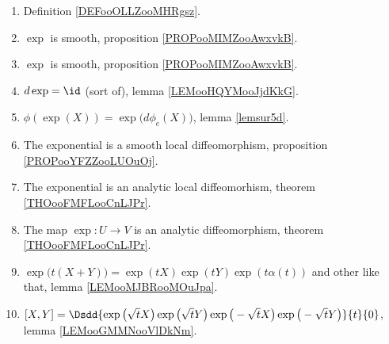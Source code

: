\begin{enumerate}
	\item
	      Definition \ref{DEFooOLLZooMHRgsz}.
	\item
	      \( \exp\) is smooth, proposition \ref{PROPooMIMZooAwxvkB}.
	\item
	      \( \exp\) is smooth, proposition \ref{PROPooMIMZooAwxvkB}.
	\item
	      \( d\exp=\id\) (sort of), lemma \ref{LEMooHQYMooJjdKkG}.
	\item
	      \( \phi(\exp(X))=\exp\big( d\phi_e(X) \big)\), lemma \ref{lemsur5d}.
	\item
	      The exponential is a smooth local diffeomorphism, proposition \ref{PROPooYFZZooLUOuOj}.
	\item
	      The exponential is an analytic local diffeomorhism, theorem \ref{THOooFMFLooCnLJPr}.
	\item
	      The map \( \exp\colon U\to V\) is an analytic diffeomorphism, theorem \ref{THOooFMFLooCnLJPr}.
	\item
	      \( \exp\big( t(X+Y) \big)=\exp(tX)\exp(tY)\exp(t\alpha(t))\) and other like that, lemma \ref{LEMooMJBRooMOuJpa}.
	\item
	      $[X,Y]=\Dsdd{ \exp\big( \sqrt{ t }X \big)\exp\big( \sqrt{ t }Y \big)\exp\big( -\sqrt{ t }X \big)\exp\big( -\sqrt{ t }Y \big) }{t}{0}$, lemma \ref{LEMooGMMNooVlDkNm}.
\end{enumerate}

